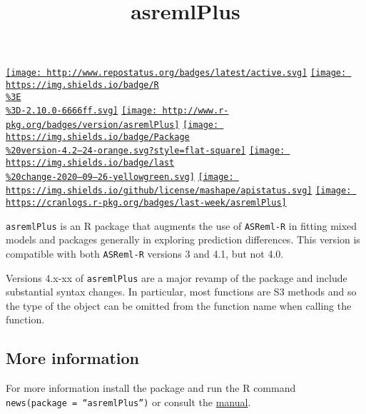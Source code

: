 \documentclass[
]{article}
\title{asremlPlus}
\author{}
\date{\vspace{-2.5em}}
\begin{document}
\maketitle

\href{http://www.repostatus.org/\#active}{\texttt{[image: http://www.repostatus.org/badges/latest/active.svg]}}
\href{https://cran.r-project.org/}{\texttt{[image: https://img.shields.io/badge/R\\\%3E\\\%3D-2.10.0-6666ff.svg]}}
\href{https://cran.r-project.org/package=asremlPlus}{\texttt{[image: http://www.r-pkg.org/badges/version/asremlPlus]}}
\href{/commits/master}{\texttt{[image: https://img.shields.io/badge/Package\\\%20version-4.2--24-orange.svg?style=flat-square]}}
\href{/commits/master}{\texttt{[image: https://img.shields.io/badge/last\\\%20change-2020--09--26-yellowgreen.svg]}}
\href{http://choosealicense.com/licenses/mit/}{\texttt{[image: https://img.shields.io/github/license/mashape/apistatus.svg]}}
\href{commits/master}{\texttt{[image: https://cranlogs.r-pkg.org/badges/last-week/asremlPlus]}}

\texttt{asremlPlus} is an R package that augments the use of
\texttt{ASReml-R} in fitting mixed models and packages generally in
exploring prediction differences. This version is compatible with both
\texttt{ASReml-R} versions 3 and 4.1, but not 4.0.

Versions 4.x-xx of \texttt{asremlPlus} are a major revamp of the package
and include substantial syntax changes. In particular, most functions
are S3 methods and so the type of the object can be omitted from the
function name when calling the function.

\hypertarget{more-information}{%
\subsection{More information}\label{more-information}}

For more information install the package and run the R command
\texttt{news(package\ =\ “asremlPlus”)} or consult the
\href{./vignettes/asremlPlus-manual.pdf}{manual}.
\end{document}
